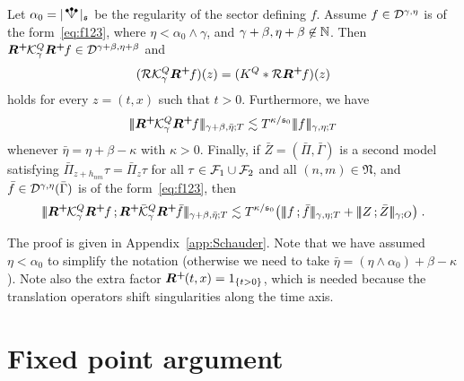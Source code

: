 \documentclass[reqno,11pt]{article}
\def\Rplus{\boldsymbol{R^+}\hspace{-.1em}}
\def\normDgamma#1{|\!|\!|#1|\!|\!|}
\def\seminormff#1#2{|\!|\!|#1\,\mathord{;}\,#2|\!|\!|}
\def\fraks{\mathfrak{s}}
\def\abss#1{\abs{#1}_\mathfrak{s}}
\newcommand{\setnm}{\mathfrak{N}}
\begin{document}
\begin{theorem}
\label{thm:Schauder} 
Let $\alpha_0 = \abss{\RSW}$ be the regularity of the sector defining $f$. 
Assume $f\in{\mathcal D}^{\gamma,\eta}$ is of the form~\eqref{eq:f123}, where $\eta < 
\alpha_0\wedge\gamma$, and $\gamma+\beta, \eta+\beta \not\in\mathbb{N}$. Then 
$\Rplus\cK^Q_\gamma\Rplus f \in \cD^{\gamma+\beta,\eta+\beta}$ and 
\begin{equation}
\label{eq:schauder1} 
 (\cR\cK^Q_\gamma \Rplus f)(z) = (K^Q * \cR \Rplus f)(z)
\end{equation}
holds for every $z=(t,x)$ such that $t>0$. 
Furthermore, we have 
\begin{equation}
\label{eq:schauder2} 
 \normDgamma{\Rplus\cK^Q_\gamma\Rplus f}_{\gamma+\beta,\bar\eta;T}
 \lesssim T^{\kappa/\fraks_0} \normDgamma{f}_{\gamma,\eta;T}
\end{equation} 
whenever $\bar\eta = \eta+\beta-\kappa$ with $\kappa>0$. 
Finally, if $\bar Z=(\bar\Pi,\bar\Gamma)$ is a second model satisfying 
$\bar\Pi_{z+h_{nm}}\tau = \bar\Pi_z\tau$ for all $\tau\in{\mathcal F}_1\cup{\mathcal F}_2$ and 
all $(n,m)\in\setnm$, and $\bar f\in{\mathcal D}^{\gamma,\eta}(\bar\Gamma)$ is of the 
form~\eqref{eq:f123}, then 
\begin{equation}
\label{eq:schauder3} 
 \seminormff{\Rplus\cK^Q_\gamma\Rplus f}{\Rplus\bar\cK^Q_\gamma\Rplus
\bar f}_{\gamma+\beta,\bar\eta;T}
 \lesssim T^{\kappa/\fraks_0}
\bigpar{\seminormff{f}{\bar f}_{\gamma,\eta;T} + \seminormff{Z}{\bar
Z}_{\gamma;O}}\;.
\end{equation}
\end{theorem}

The proof is given in Appendix~\ref{app:Schauder}. Note that we have assumed
$\eta<\alpha_0$ to simplify the notation (otherwise we need to 
take $\bar\eta = (\eta\wedge\alpha_0)+\beta-\kappa$). 
Note also the extra factor $\Rplus(t,x) = \indexfct{t>0}$, which is needed 
because the translation operators shift singularities along the time axis. 


\section{Fixed point argument}
\label{sec:fixedpoint} 
\end{document}
